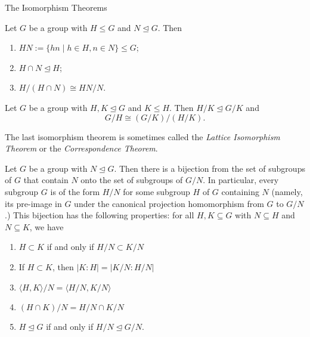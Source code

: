 \begin{section}{The Isomorphism Theorems}
\begin{theorem}
Let $G$ be a group with $H\leq G$ and $N\trianglelefteq G$.  Then
\begin{enumerate}[label=\rm{(\alph*)}]
\item $HN:=\{hn\mid h\in H, n\in N\}\leq G$;
\item $H\cap N\trianglelefteq H$;
\item $\displaystyle H/(H\cap N)\cong HN/N$.
\end{enumerate}
\end{theorem}

\begin{theorem}
Let $G$ be a group with $H,K\trianglelefteq G$ and $K\leq H$.  Then $H/K\trianglelefteq G/K$ and
\[
G/H\cong (G/K)/(H/K).
\]
\end{theorem}

The last isomorphism theorem is sometimes called the \emph{Lattice Isomorphism Theorem} or the \emph{Correspondence Theorem}.

\begin{theorem}

Let $G$ be a group with $N\trianglelefteq G$. Then there is a bijection from the set of subgroups of $G$ that contain $N$ onto the set of subgroups of $G/N$. In particular, every subgroup $G$ is of the form $H/N$ for some subgroup $H$ of $G$ containing $N$ (namely, its pre-image in $G$ under the canonical projection homomorphism from $G$ to $G/N$.) This bijection has the following properties: for all $H,K \subseteq G$ with  $N\subseteq H$ and $N\subseteq K$, we have
\begin{enumerate}[label=\rm{(\alph*)}]
\item $H\subset K$ if and only if $H/N \subset K/N$
\item If $H\subset K$, then $|K:H|=|K/N:H/N|$
\item $\langle H,K\rangle/N=\langle H/N,K/N\rangle$
\item $(H\cap K)/N=H/N \cap K/N$
\item $H\trianglelefteq G$ if and only if $H/N\trianglelefteq G/N$.
\end{enumerate}
\end{theorem}

\end{section}